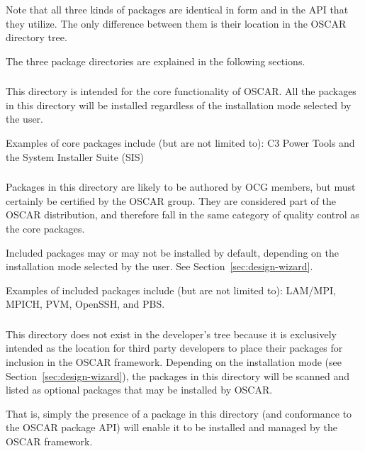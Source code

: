 Note that all three kinds of packages are identical in form and in the
API that they utilize.  The only difference between them is their
location in the OSCAR directory tree.

The three package directories are explained in the following sections.

\subsubsection{}

This directory is intended for the core functionality of OSCAR.  All
the packages in this directory will be installed regardless of the
installation mode selected by the user.

Examples of core packages include (but are not limited to): C3 Power
Tools and the System Installer Suite (SIS)


\subsubsection{}

Packages in this directory are likely to be authored by OCG members,
but must certainly be certified by the OSCAR group.  They are
considered part of the OSCAR distribution, and therefore fall in the
same category of quality control as the core packages.

Included packages may or may not be installed by default, depending on
the installation mode selected by the user.  See
Section~\ref{sec:design-wizard}.

Examples of included packages include (but are not limited to):
LAM/MPI, MPICH, PVM, OpenSSH, and PBS.


\subsubsection{}

This directory does not exist in the developer's tree because it is
exclusively intended as the location for third party developers to
place their packages for inclusion in the OSCAR framework.  Depending
on the installation mode (see Section~\ref{sec:design-wizard}), the
packages in this directory will be scanned and listed as optional
packages that may be installed by OSCAR.

That is, simply the presence of a package in this directory (and
conformance to the OSCAR package API) will enable it to be installed
and managed by the OSCAR framework.  

